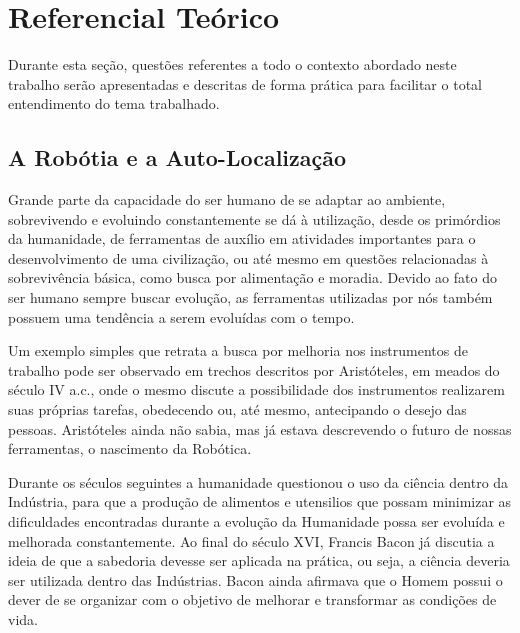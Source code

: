
\chapter[Referencial Teórico]{Referencial Teórico}
	
	Durante esta seção, questões referentes a todo o contexto abordado neste trabalho serão apresentadas e descritas de forma prática para facilitar o total entendimento do tema trabalhado.

\section{A Robótia e a Auto-Localização}

	Grande parte da capacidade do ser humano de se adaptar ao ambiente, sobrevivendo e evoluindo constantemente se dá à utilização, desde os primórdios da humanidade, de ferramentas de auxílio em atividades importantes para o desenvolvimento de uma civilização, ou até mesmo em questões relacionadas à sobrevivência básica, como busca por alimentação e moradia. Devido ao fato do ser humano sempre buscar evolução, as ferramentas utilizadas por nós também possuem uma tendência a serem evoluídas com o tempo.

	Um exemplo simples que retrata a busca por melhoria nos instrumentos de trabalho pode ser observado em trechos descritos por Aristóteles, em meados do século IV a.c., onde o mesmo discute a possibilidade dos instrumentos realizarem suas próprias tarefas, obedecendo ou, até mesmo, antecipando o desejo das pessoas. Aristóteles ainda não sabia, mas já estava descrevendo o futuro de nossas ferramentas, o nascimento da Robótica.

	Durante os séculos seguintes a humanidade questionou o uso da ciência dentro da Indústria, para que a produção de alimentos e utensilios que possam minimizar as dificuldades encontradas durante a evolução da Humanidade possa ser evoluída e melhorada constantemente. Ao final do século XVI, Francis Bacon já discutia a ideia de que a sabedoria devesse ser aplicada na prática, ou seja, a ciência deveria ser utilizada dentro das Indústrias. Bacon ainda afirmava que o Homem possui o dever de se organizar com o objetivo de melhorar e transformar as condições de vida.